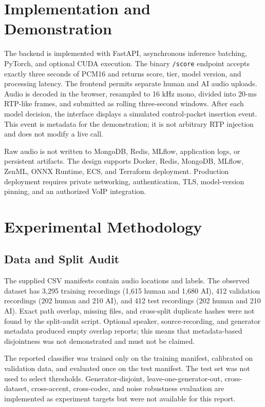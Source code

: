 \documentclass[journal]{IEEEtran}
\begin{document}
\section{Implementation and Demonstration}
The backend is implemented with FastAPI, asynchronous inference batching, PyTorch, and optional CUDA execution. The binary \texttt{/score} endpoint accepts exactly three seconds of PCM16 and returns score, tier, model version, and processing latency. The frontend permits separate human and AI audio uploads. Audio is decoded in the browser, resampled to 16 kHz mono, divided into 20-ms RTP-like frames, and submitted as rolling three-second windows. After each model decision, the interface displays a simulated control-packet insertion event. This event is metadata for the demonstration; it is not arbitrary RTP injection and does not modify a live call.

Raw audio is not written to MongoDB, Redis, MLflow, application logs, or persistent artifacts. The design supports Docker, Redis, MongoDB, MLflow, ZenML, ONNX Runtime, ECS, and Terraform deployment. Production deployment requires private networking, authentication, TLS, model-version pinning, and an authorized VoIP integration.

\section{Experimental Methodology}
\subsection{Data and Split Audit}
The supplied CSV manifests contain audio locations and labels. The observed dataset has 3,295 training recordings (1,615 human and 1,680 AI), 412 validation recordings (202 human and 210 AI), and 412 test recordings (202 human and 210 AI). Exact path overlap, missing files, and cross-split duplicate hashes were not found by the split-audit script. Optional speaker, source-recording, and generator metadata produced empty overlap reports; this means that metadata-based disjointness was not demonstrated and must not be claimed.

The reported classifier was trained only on the training manifest, calibrated on validation data, and evaluated once on the test manifest. The test set was not used to select thresholds. Generator-disjoint, leave-one-generator-out, cross-dataset, cross-accent, cross-codec, and noise robustness evaluation are implemented as experiment targets but were not available for this report.
\end{document}
